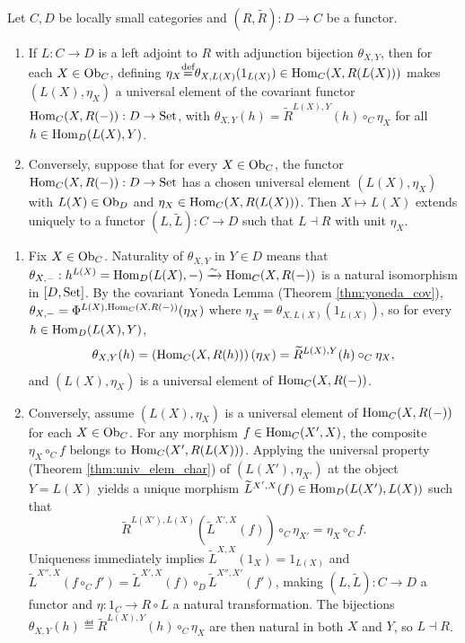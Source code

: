 \documentclass[10pt,a4paper]{article}
\begin{document}
\begin{theorem}\label{thm:adj_yoneda}
Let $C, D$ be locally small categories and $(R, \widetilde{R}) : D \to C$ be a functor.
\begin{enumerate}
\item If $L : C \to D$ is a left adjoint to $R$ with adjunction bijection $\theta_{X,Y}$, then for each $X \in {\textrm{Ob}}_C$, defining $\eta_X {\stackrel{{\textrm{def}}}{=}} \theta_{X,L(X)}(1_{L(X)}) \in {\textrm{Hom}}_C(X, R(L(X)))$ makes $(L(X), \eta_X)$ a universal element of the covariant functor ${\textrm{Hom}}_C(X, R(-)) : D \to {\textrm{Set}}$, with $\theta_{X,Y}(h) = \widetilde{R}^{L(X),Y}(h) \circ_C \eta_X$ for all $h \in {\textrm{Hom}}_D(L(X), Y)$.
\item Conversely, suppose that for every $X \in {\textrm{Ob}}_C$, the functor ${\textrm{Hom}}_C(X, R(-)) : D \to {\textrm{Set}}$ has a chosen universal element $(L(X), \eta_X)$ with $L(X) \in {\textrm{Ob}}_D$ and $\eta_X \in {\textrm{Hom}}_C(X, R(L(X)))$. Then $X \mapsto L(X)$ extends uniquely to a functor $(L, \widetilde{L}) : C \to D$ such that $L \dashv R$ with unit $\eta_X$.
\end{enumerate}
\end{theorem}
\myprf
\begin{enumerate}
\item Fix $X \in {\textrm{Ob}}_C$. Naturality of $\theta_{X,Y}$ in $Y \in D$ means that $\theta_{X,-} : h^{L(X)} = {\textrm{Hom}}_D(L(X), -) \xrightarrow{\sim} {\textrm{Hom}}_C(X, R(-))$ is a natural isomorphism in $[D, {\textrm{Set}}]$. By the covariant Yoneda Lemma (Theorem \ref{thm:yoneda_cov}), $\theta_{X,-} = \Phi^{L(X), {\textrm{Hom}}_C(X,R(-))}(\eta_X)$ where $\eta_X = \theta_{X,L(X)}(1_{L(X)})$, so for every $h \in {\textrm{Hom}}_D(L(X), Y)$,
$$\theta_{X,Y}(h) = \left({\textrm{Hom}}_C(X, R(h))\right)(\eta_X) = \widetilde{R}^{L(X),Y}(h) \circ_C \eta_X,$$
and $(L(X), \eta_X)$ is a universal element of ${\textrm{Hom}}_C(X, R(-))$.
\item Conversely, assume $(L(X), \eta_X)$ is a universal element of ${\textrm{Hom}}_C(X, R(-))$ for each $X \in {\textrm{Ob}}_C$. For any morphism $f \in {\textrm{Hom}}_C(X', X)$, the composite $\eta_X \circ_C f$ belongs to ${\textrm{Hom}}_C(X', R(L(X)))$. Applying the universal property (Theorem \ref{thm:univ_elem_char}) of $(L(X'), \eta_{X'})$ at the object $Y = L(X)$ yields a unique morphism $\widetilde{L}^{X',X}(f) \in {\textrm{Hom}}_D(L(X'), L(X))$ such that
$$\widetilde{R}^{L(X'),L(X)}\left(\widetilde{L}^{X',X}(f)\right) \circ_C \eta_{X'} = \eta_X \circ_C f.$$
Uniqueness immediately implies $\widetilde{L}^{X,X}(1_X) = 1_{L(X)}$ and $\widetilde{L}^{X'',X}(f \circ_C f') = \widetilde{L}^{X',X}(f) \circ_D \widetilde{L}^{X'',X'}(f')$, making $(L, \widetilde{L}) : C \to D$ a functor and $\eta : 1_C \to R \circ L$ a natural transformation. The bijections $\theta_{X,Y}(h) \eqdef \widetilde{R}^{L(X),Y}(h) \circ_C \eta_X$ are then natural in both $X$ and $Y$, so $L \dashv R$.
\end{enumerate}
\myqed
\end{document}
